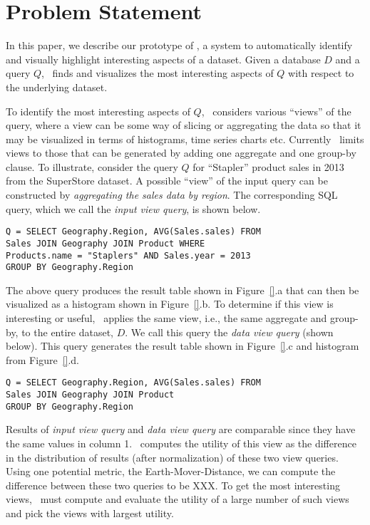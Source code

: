 \section{Problem Statement}
\label{sec:problem_statement}

In this paper, we describe our prototype of \SeeDB, a system to
automatically identify and visually highlight interesting aspects of a dataset.
Given a database $D$ and a query $Q$, \SeeDB\ finds and visualizes the most
interesting aspects of $Q$ with respect to the underlying dataset. 

To identify the most interesting aspects of $Q$, \SeeDB\ considers various
``views'' of the query, where a view can be some way of slicing or aggregating
the data so that it may be visualized in terms of histograms, time series charts
etc. Currently \SeeDB\ limits views to those that can be generated by adding one
aggregate and one group-by clause. To illustrate, consider the query $Q$
for ``Stapler'' product sales in 2013 from the SuperStore dataset. A possible
``view'' of the input query can be constructed by {\it aggregating the sales
data by region}. The corresponding SQL query, which we call the {\it input view
query}, is shown below.

\noindent 
\begin{small}
\begin{verbatim}
Q = SELECT Geography.Region, AVG(Sales.sales) FROM 
Sales JOIN Geography JOIN Product WHERE 
Products.name = "Staplers" AND Sales.year = 2013
GROUP BY Geography.Region
\end{verbatim}
\end{small}

The above query produces the result table shown in
Figure~\ref{}.a that can then be visualized as a histogram shown in
Figure~\ref{}.b. To determine if this view is interesting or useful, \SeeDB\
applies the same view, i.e., the same aggregate and group-by, to the
entire dataset, $D$. We call this query the {\it data view query} (shown below). This
query generates the result table shown in Figure~\ref{}.c and histogram from
Figure~\ref{}.d.

\noindent 
\begin{small}
\begin{verbatim}
Q = SELECT Geography.Region, AVG(Sales.sales) FROM 
Sales JOIN Geography JOIN Product
GROUP BY Geography.Region
\end{verbatim}
\end{small}

Results of {\it input view query} and {\it data view query} are comparable since
they have the same values in column 1. \SeeDB\ computes the utility of this view
as the difference in the distribution of results (after normalization) of these
two view queries. Using one potential metric, the Earth-Mover-Distance, we can
compute the difference between these two queries to be XXX. To get the most interesting
views, \SeeDB\ must compute and evaluate the utility of a large number of such
views and pick the views with largest utility. 

